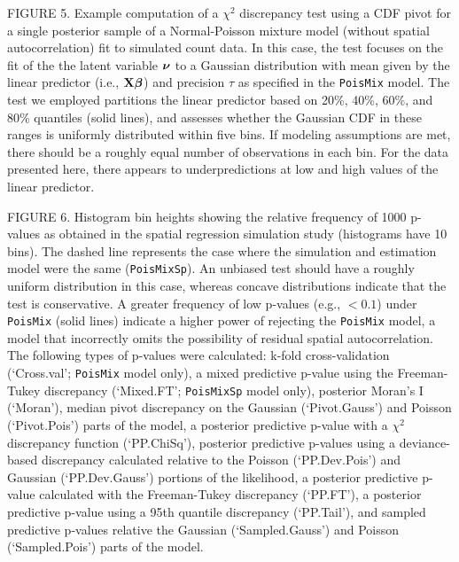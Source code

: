 \documentclass[12pt,english]{article}
\begin{document}
\begin{spacing}{1.9}
FIGURE 5.  Example computation of a $\chi^2$ discrepancy test using a CDF pivot for a single posterior sample of a Normal-Poisson mixture model (without spatial autocorrelation) fit to simulated count data.  In this case, the test focuses on the fit of the the latent variable $\boldsymbol{\nu}$ to a Gaussian distribution with mean given by the linear predictor (i.e., ${\bf X}\boldsymbol{\beta}$) and precision $\tau$ as specified in the \texttt{PoisMix} model. The test we employed partitions the linear predictor based on 20\%, 40\%, 60\%, and 80\% quantiles (solid lines), and assesses whether the Gaussian CDF in these ranges is uniformly distributed within five bins.  If modeling assumptions are met, there should be a roughly equal number of observations in each bin.  For the data presented here, there appears to underpredictions at low and high values of the linear predictor.

FIGURE 6.  Histogram bin heights showing the relative frequency of 1000 p-values as obtained in the spatial regression simulation study (histograms have 10 bins).  The dashed line represents the case where the simulation and estimation model were the same (\texttt{PoisMixSp}).  An unbiased test should have a roughly uniform distribution in this case, whereas concave distributions indicate that the test is conservative.  A greater frequency of low p-values (e.g., $<0.1$) under \texttt{PoisMix} (solid lines) indicate a higher power of rejecting the \texttt{PoisMix} model, a model that incorrectly omits the possibility of residual spatial autocorrelation.  The following types of p-values were calculated: k-fold cross-validation (`Cross.val'; \texttt{PoisMix} model only), a mixed predictive p-value using the Freeman-Tukey discrepancy (`Mixed.FT'; \texttt{PoisMixSp} model only), posterior Moran's I (`Moran'), median pivot discrepancy on the Gaussian (`Pivot.Gauss') and Poisson (`Pivot.Pois') parts of the model, a posterior predictive p-value with a $\chi^2$ discrepancy function (`PP.ChiSq'), posterior predictive p-values using a deviance-based discrepancy calculated relative to the Poisson (`PP.Dev.Pois') and Gaussian (`PP.Dev.Gauss') portions of the likelihood, a posterior predictive p-value calculated with the Freeman-Tukey discrepancy (`PP.FT'), a posterior predictive p-value using a 95th quantile discrepancy (`PP.Tail'), and sampled predictive p-values relative the Gaussian (`Sampled.Gauss') and Poisson (`Sampled.Pois') parts of the model.


\pagebreak


\end{spacing}
\end{document}
